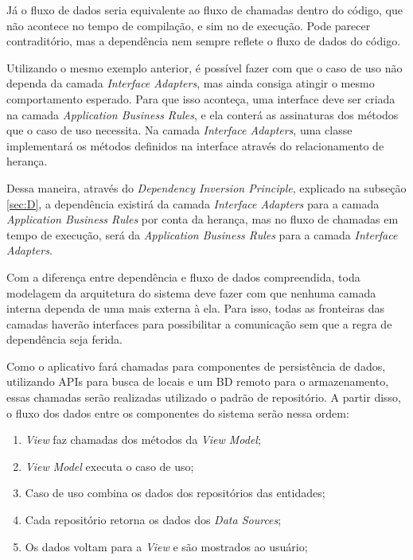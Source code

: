 Já o fluxo de dados seria equivalente ao fluxo de chamadas dentro do código, que não acontece no tempo de compilação, e sim no de execução. Pode parecer contraditório, mas a dependência nem sempre reflete o fluxo de dados do código.

Utilizando o mesmo exemplo anterior, é possível fazer com que o caso de uso não dependa da camada \textit{Interface Adapters}, mas ainda consiga atingir o mesmo comportamento esperado. Para que isso aconteça, uma interface deve ser criada na camada \textit{Application Business Rules}, e ela conterá as assinaturas dos métodos que o caso de uso necessita. Na camada \textit{Interface Adapters}, uma classe implementará os métodos definidos na interface através do relacionamento de herança.

Dessa maneira, através do \textit{Dependency Inversion Principle}, explicado na subseção \ref{sec:D}, a dependência existirá da camada \textit{Interface Adapters} para a camada \textit{Application Business Rules} por conta da herança, mas no fluxo de chamadas em tempo de execução, será da \textit{Application Business Rules} para a camada \textit{Interface Adapters}.

Com a diferença entre dependência e fluxo de dados compreendida, toda modelagem da arquitetura do sistema deve fazer com que nenhuma camada interna dependa de uma mais externa à ela. Para isso, todas as fronteiras das camadas haverão interfaces para possibilitar a comunicação sem que a regra de dependência seja ferida.

Como o aplicativo fará chamadas para componentes de persistência de dados, utilizando APIs para busca de locais e um BD remoto para o armazenamento, essas chamadas serão realizadas utilizado o padrão de repositório. A partir disso, o fluxo dos dados entre os componentes do sistema serão nessa ordem:

\begin{enumerate}
  \item \textit{View} faz chamadas dos métodos da \textit{View Model};
  \item \textit{View Model} executa o caso de uso;
  \item Caso de uso combina os dados dos repositórios das entidades;
  \item Cada repositório retorna os dados dos \textit{Data Sources};
  \item Os dados voltam para a \textit{View} e são mostrados ao usuário;
\end{enumerate}

